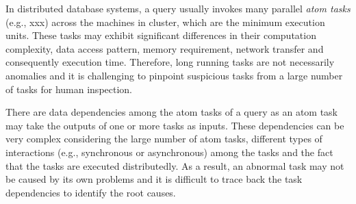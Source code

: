 %
%


 In distributed database systems, a query usually invokes many parallel \textit{atom tasks} (e.g., xxx) across the machines in cluster, which are the minimum execution units. These tasks may exhibit significant differences in their computation complexity, data access pattern, memory requirement, network transfer and consequently execution time. Therefore, long running tasks are not necessarily anomalies and it is challenging to pinpoint suspicious tasks from a large number of tasks for human inspection.        


 There are data dependencies among the atom tasks of a query as an atom task may take the outputs of one or more tasks as inputs. These dependencies can be very complex considering the large number of atom tasks, different types of interactions (e.g., synchronous or asynchronous) among the tasks and the fact that the tasks are executed distributedly. As a result, an abnormal task may not be caused by its own problems and it is difficult to trace back the task dependencies to identify the root causes.  



